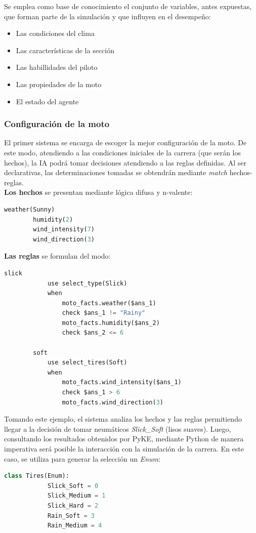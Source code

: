 \documentclass[12pt, letterpaper,spanish]{article}
\theoremstyle{definition}
\theoremstyle{remark}
\begin{document}
	Se emplea como base de conocimiento el conjunto de variables, antes expuestas, que forman parte de la simulación y que influyen en el desempeño:
	\begin{itemize}
		\item Las condiciones del clima
		\item Las características de la sección
		\item Las habillidades del piloto
		\item Las propiedades de la moto
		\item El estado del agente
	\end{itemize}
	
		\subsubsection{Configuración de la moto}
		El primer sistema se encarga de escoger la mejor configuración de la moto. De este modo, atendiendo a las condiciones iniciales de la carrera (que serán los hechos), la IA podrá tomar decisiones atendiendo a las reglas definidas. Al ser declarativas, las determinaciones tomadas se obtendrán mediante \emph{match} hechos-reglas. \\
		
		\textbf{Los hechos} se presentan mediante lógica difusa y n-valente:
		\begin{lstlisting}[language={Python}, label={Script}]
		weather(Sunny)
		humidity(2)
		wind_intensity(7)
		wind_direction(3)
		\end{lstlisting}
	
		\textbf{Las reglas} se formulan del modo:
		\begin{lstlisting}[language={Python}, label={Script}]
		slick
		    use select_type(Slick)
		    when
		        moto_facts.weather($ans_1)
		        check $ans_1 != "Rainy"
		        moto_facts.humidity($ans_2)
		        check $ans_2 <= 6
		
		soft
		    use select_tires(Soft)
		    when
		        moto_facts.wind_intensity($ans_1)
		        check $ans_1 > 6
		        moto_facts.wind_direction(3)
		\end{lstlisting}

		Tomando este ejemplo, el sistema analiza los hechos y las reglas permitiendo llegar a la decisión de tomar neumáticos \emph{Slick\_Soft} (lisos suaves). Luego, consultando los resultados obtenidos por PyKE, mediante Python de manera imperativa será posible la interacción con la simulación de la carrera. En este caso, se utiliza para generar la selección un \emph{Enum}:
		\begin{lstlisting}[language={Python}, label={Script}]
		class Tires(Enum):
		    Slick_Soft = 0
		    Slick_Medium = 1
		    Slick_Hard = 2
		    Rain_Soft = 3
		    Rain_Medium = 4
		\end{lstlisting}
\end{document}

